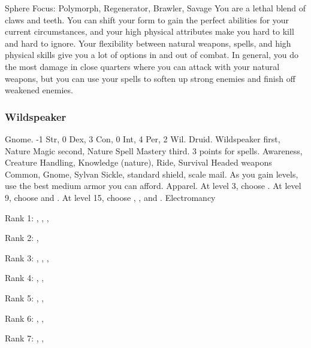              Sphere Focus: Polymorph, Regenerator, Brawler, Savage
             You are a lethal blend of claws and teeth.
            You can shift your form to gain the perfect abilities for your current circumstances, and your high physical attributes make you hard to kill and hard to ignore.
            Your flexibility between natural weapons, spells, and high physical skills give you a lot of options in and out of combat.
            In general, you do the most damage in close quarters where you can attack with your natural weapons, but you can use your spells to soften up strong enemies and finish off weakened enemies.

        \subsubsection{Wildspeaker}
             Gnome.
             -1 Str, 0 Dex, 3 Con, 0 Int, 4 Per, 2 Wil.
             Druid.
             Wildspeaker first, Nature Magic second, Nature Spell Mastery third.
             3 points for spells.
             Awareness, Creature Handling, Knowledge (nature), Ride, Survival
             Headed weapons
             Common, Gnome, Sylvan
             Sickle, standard shield, scale mail. As you gain levels, use the best medium armor you can afford.
             Apparel.
                At level 3, choose .
                At level 9, choose  and .
                At level 15, choose , , and .
             Electromancy
            \begin{raggeditemize}
                \item Rank 1: , , , 
                \item Rank 2: , 
                \item Rank 3: , , , 
                \item Rank 4: , , 
                \item Rank 5: , , 
                \item Rank 6: , , 
                \item Rank 7: , , 
            \end{raggeditemize}
